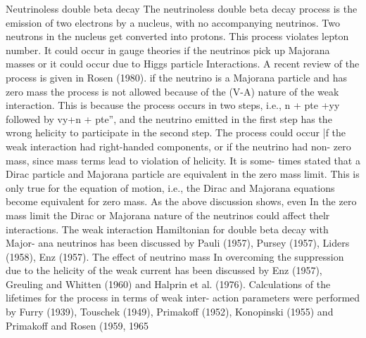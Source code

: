 \documentclass[twoside]{article}
\begin{document}
{{{{{{{{{{{{{{Neutrinoless double beta decay
The neutrinoless double beta decay process is the emission of two
electrons by a nucleus, with no accompanying neutrinos. Two neutrons in
the nucleus get converted into protons. This process violates lepton
number. It could occur in gauge theories if the neutrinos pick up
Majorana masses or it could occur due to Higgs particle Interactions.
A recent review of the process is given in Rosen (1980). if the neutrino
is a Majorana particle and has zero mass the process is not allowed
because of the (V-A) nature of the weak interaction. This is because
the process occurs in two steps, i.e., n + pte +yy followed by vy+n +
pte”, and the neutrino emitted in the first step has the wrong helicity
to participate in the second step. The process could occur |f the weak
interaction had right-handed components, or if the neutrino had non-
zero mass, since mass terms lead to violation of helicity. It is some-
times stated that a Dirac particle and Majorana particle are equivalent
in the zero mass limit. This is only true for the equation of motion,
i.e., the Dirac and Majorana equations become equivalent for zero mass.
As the above discussion shows, even In the zero mass limit the Dirac or
Majorana nature of the neutrinos could affect thelr interactions.
The weak interaction Hamiltonian for double beta decay with Major-
ana neutrinos has been discussed by Pauli (1957), Pursey (1957), Liders
(1958), Enz (1957). The effect of neutrino mass In overcoming the
suppression due to the helicity of the weak current has been discussed
by Enz (1957), Greuling and Whitten (1960) and Halprin et al. (1976).
Calculations of the lifetimes for the process in terms of weak inter-
action parameters were performed by Furry (1939), Touschek (1949),
Primakoff (1952), Konopinski (1955) and Primakoff and Rosen (1959, 1965

}}}}}}}}}}}}}}
\end{document}
